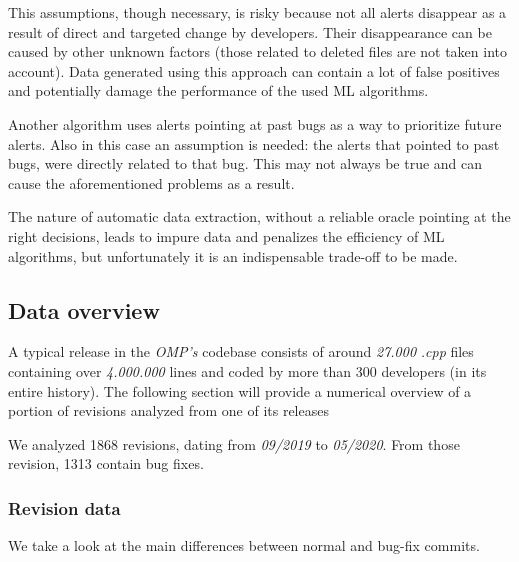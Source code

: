 This assumptions, though necessary, is risky because not all alerts disappear as a result of direct and targeted change by developers. Their disappearance can be caused by other unknown factors (those related to deleted files are not taken into account). Data generated using this approach can contain a lot of false positives and potentially damage the performance of the used ML algorithms.

Another algorithm uses alerts pointing at past bugs as a way to prioritize future alerts. Also in this case an assumption is needed: the alerts that pointed to past bugs, were directly related to that bug. This may not always be true and can cause the aforementioned problems as a result.

The nature of automatic data extraction, without a reliable oracle pointing at the right decisions, leads to impure data and penalizes the efficiency of ML algorithms, but unfortunately it is an indispensable trade-off to be made.

\subsection{Data overview}

A typical release in the \textit{OMP's} codebase consists of around \textit{27.000} \textit{.cpp} files containing over \textit{4.000.000} lines and coded by more than 300 developers (in its entire history). The following section will provide a numerical overview of a portion of revisions analyzed from one of its releases 

We analyzed 1868 revisions, dating from \textit{09/2019} to \textit{05/2020}. From those revision, 1313 contain bug fixes. 

\subsubsection{Revision data}
We take a look at the main differences between normal and bug-fix commits.


